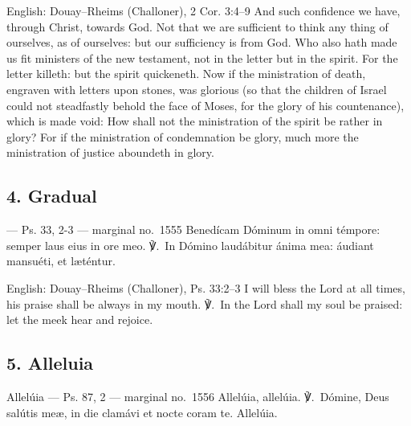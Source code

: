 \begin{namedtranslation}{English: Douay--Rheims (Challoner), 2 Cor. 3:4--9}
And such confidence we have, through Christ, towards God. Not that we are
sufficient to think any thing of ourselves, as of ourselves: but our
sufficiency is from God. Who also hath made us fit ministers of the new
testament, not in the letter but in the spirit. For the letter killeth: but
the spirit quickeneth. Now if the ministration of death, engraven with letters
upon stones, was glorious (so that the children of Israel could not
steadfastly behold the face of Moses, for the glory of his countenance), which
is made void: How shall not the ministration of the spirit be rather in glory?
For if the ministration of condemnation be glory, much more the ministration
of justice aboundeth in glory.
\end{namedtranslation}


\elementguard
\subsection*{4. Gradual }

\begin{appointedlatin}{ --- Ps. 33, 2-3 --- marginal no.\ 1555}
Benedícam Dóminum in omni témpore: semper laus eius in ore meo. ℣.~In Dómino
laudábitur ánima mea: áudiant mansuéti, et læténtur.
\end{appointedlatin}

\begin{namedtranslation}{English: Douay--Rheims (Challoner), Ps. 33:2--3}
I will bless the Lord at all times, his praise shall be always in my mouth.
℣.~In the Lord shall my soul be praised: let the meek hear and rejoice.
\end{namedtranslation}

\elementguard
\subsection*{5. Alleluia }

\begin{appointedlatin}{Allelúia --- Ps. 87, 2 --- marginal no.\ 1556}
Allelúia, allelúia. ℣.~Dómine, Deus salútis meæ, in die clamávi et nocte coram
te. Allelúia.
\end{appointedlatin}

